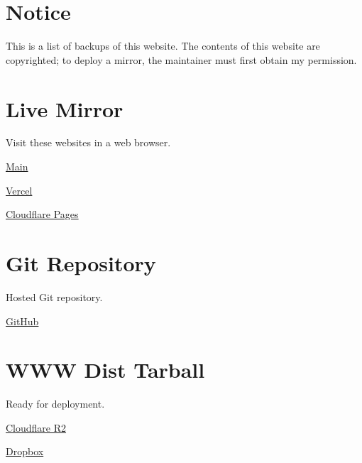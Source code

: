 




\section*{Notice}

This is a list of backups of this website.
The contents of this website are copyrighted; to deploy a mirror, the maintainer must first obtain my permission.

\section*{Live Mirror}

Visit these websites in a web browser.

\begin{compactitem}
    \item \href{https://neruthes.xyz/}{Main}
    \item \href{https://neruthes.vercel.app/}{Vercel}
    \item \href{https://neruthes.pages.dev/}{Cloudflare Pages}
\end{compactitem}

\section*{Git Repository}

Hosted Git repository.

\begin{compactitem}
    \item \href{https://github.com/neruthes/homepage-gen3}{GitHub}
\end{compactitem}

\section*{WWW Dist Tarball}

Ready for deployment.

\begin{compactitem}
    \item \href{https://pub-714f8d634e8f451d9f2fe91a4debfa23.r2.dev/files/neruthes-homepage-gen3/pkgdist/wwwdist.tar}{Cloudflare R2}
    \item \href{https://www.dropbox.com/s/x7qxeceaaytbkui/wwwdist.tar?dl=0}{Dropbox}
\end{compactitem}

